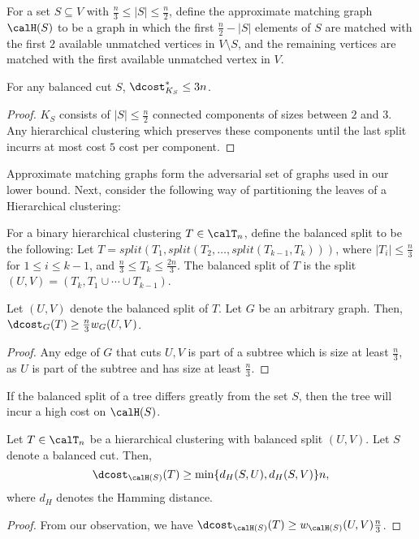 \begin{defn}
For a set $S \subseteq V$ with $\frac{n}{3} \leq |S| \leq \frac{n}{2}$, define the approximate matching graph $\calH(S)$ to be a graph in which the first $\frac{n}{2} - |S|$ elements of $S$ are matched with the first $2$ available unmatched vertices in $V \setminus S$, and the remaining vertices are matched with the first available unmatched vertex in $V$.
\end{defn}
\begin{obs}
For any balanced cut $S$, $\dcost_{K_S}^* \leq 3n$.
\end{obs}
\begin{proof}
$K_S$ consists of $|S| \leq \frac{n}{2}$ connected components of sizes between $2$ and $3$. Any hierarchical clustering which preserves these components until the last split incurrs at most cost $5$ cost per component.
\end{proof}
Approximate matching graphs form the adversarial set of graphs used in our lower bound. Next, consider the following way of partitioning the leaves of a Hierarchical clustering:
\begin{defn}
For a binary hierarchical clustering $T \in \calT_n$, define the balanced split to be the following: Let $T = split(T_1, split(T_2, \ldots, split(T_{k-1}, T_k)))$, where $|T_i| \leq \frac{n}{3}$ for $1 \leq i \leq k-1$, and $\frac{n}{3} \leq T_k \leq \frac{2n}{3}$. The balanced split of $T$ is the split $(U, V) = (T_k, T_1 \cup \cdots \cup T_{k-1})$.
\end{defn}
\begin{obs}
Let $(U,V)$ denote the balanced split of $T$. Let $G$ be an arbitrary graph. Then, $\dcost_G(T) \geq \frac{n}{3} w_G(U,V)$.
\end{obs}
\begin{proof}
Any edge of $G$ that cuts $U,V$ is part of a subtree which is size at least $\frac{n}{3}$, as $U$ is part of the subtree and has size at least $\frac{n}{3}$.
\end{proof}

If the balanced split of a tree differs greatly from the set $S$, then the tree will incur a high cost on $\calH(S)$.
\begin{lem}
Let $T \in \calT_n$ be a hierarchical clustering with balanced split $(U,V)$. Let $S$ denote a balanced cut. Then, 
\[
    \dcost_{\calH(S)}(T) \geq \min\{d_H(S, U), d_H(S, V)\} n,
\]
where $d_H$ denotes the Hamming distance.
\end{lem}
\begin{proof}
From our observation, we have $\dcost_{\calH(S)}(T) \geq w_{\calH(S)}(U,V)\frac{n}{3}$. 
\end{proof}
\fi 

